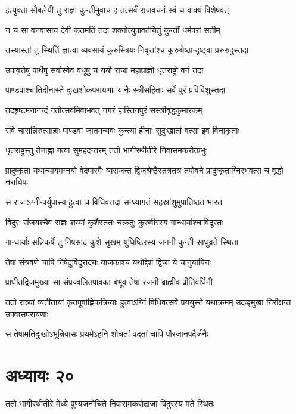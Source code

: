 \twolineshloka
{इत्युक्ता सौबलेयी तु राज्ञा कुन्तीमुवाच ह}
{तत्सर्वं राजवचनं स्वं च वाक्यं विशेषवत्}


\twolineshloka
{न च सा वनवासाय देवी कृतमतिं तदा}
{शक्नोत्युपावर्तयितुं कुन्तीं धर्मपरां सतीम्}


\twolineshloka
{तस्यास्तां तु स्थितिं ज्ञात्वा व्यवसायं कुरुस्त्रियः}
{निवृत्तांश्च कुरुश्रेष्ठान्दृष्ट्वा प्ररुरुदुस्तदा}


\twolineshloka
{उपावृत्तेषु पार्थेषु सर्वास्वेव वधूषु च}
{ययौ राजा महाप्राज्ञो धृतराष्ट्रो वनं तदा}


\twolineshloka
{पाण्डवाश्चातिदीनास्ते दुःखशोकपरायणाः}
{यानैः स्त्रीसहिताः सर्वे पुरं प्रविविशुस्तदा}


\twolineshloka
{तदहृष्टमनानन्दं गतोत्सवमिवाभवत्}
{नगरं हास्तिनपुरं सस्त्रीवृद्धकुमारकम्}


\twolineshloka
{सर्वे चासन्निरुत्साहाः पाण्डवा जातमन्यवः}
{कुन्त्या हीनाः सुदुःखार्ता वत्सा इव विनाकृताः}


\twolineshloka
{धृतराष्ट्रस्तु तेनाह्ना गत्वा सुमहदन्तरम्}
{ततो भागीरथीतीरे निवासमकरोत्प्रभुः}


\threelineshloka
{प्रादुष्कृता यथान्यायमग्नयो वेदपारगैः}
{व्यराजन्त द्विजश्रेष्ठैस्तत्रतत्र तपोवने}
{प्रादुष्कृताग्निरभवत्स च वृद्धो नराधिपः}


\twolineshloka
{स राजाऽग्नीन्पर्युपास्य हुत्वा च विधिवत्तदा}
{सन्ध्यागतं सहस्रांशुमुपातिष्ठत भारत}


\twolineshloka
{विदुरः संजयश्चैव राज्ञः शय्यां कुशैस्ततः}
{चक्रतुः कुरुवीरस्य गान्धार्याश्चाविदूरतः}


\twolineshloka
{गान्धार्याः सन्निकर्षे तु निषसाद कुशे सुखम्}
{युधिष्ठिरस्य जननी कुन्ती साधुव्रते स्थिता}


\twolineshloka
{तेषां संश्रवणे चापि निषेदुर्विदुरादयः}
{याजकाश्च यथोद्देशं द्विजा ये चानुयायिनः}


\twolineshloka
{प्राधीतद्विजमुख्या सा संप्रज्वलितपावका}
{बभूव तेषां रजनी ब्राह्मीव प्रीतिवर्धिनी}


\threelineshloka
{ततो रात्र्यां व्यतीतायां कृतपूर्वाह्णिकक्रियाः}
{हुत्वाऽग्निं विधिवत्सर्वे प्रययुस्ते यथाक्रमम्}
{उदङ्मुखा निरीक्षन्त उपवासपरायणाः}


\twolineshloka
{स तेषामतिदुःखोऽभून्निवासः प्रथमेऽहनि}
{शोचतां वदतां चापि पौरजानपदैर्जनैः}


\chapter{अध्यायः २०}
\twolineshloka
{ततो भागीरथीतीरे मेध्ये पुण्यजनोचिते}
{निवासमकरोद्राजा विदुरस्य मते स्थितः}


